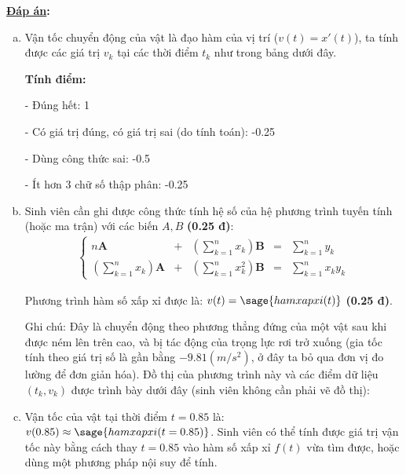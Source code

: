 \documentclass[12pt]{article}
\newcommand{\Solution}{
\medskip
{\bf \underline{Đáp án}:}
}
\begin{document}
\Solution

\begin{enumerate}[a).]
  \item Vận tốc chuyển động của vật là đạo hàm của vị trí ($v(t)=x'(t)$), ta tính được các giá trị $v_k$ tại các thời điểm $t_k$ như trong bảng dưới đây.

  \begin{center}  \end{center} 

  \textbf{Tính điểm:} 

- Đúng hết: 1

- Có giá trị đúng, có giá trị sai (do tính toán): -0.25

- Dùng công thức sai: -0.5

- Ít hơn 3 chữ số thập phân: -0.25

     \item Sinh viên cần ghi được công thức tính hệ số của hệ phương trình tuyến tính (hoặc ma trận) với các biến $A, B$ \textbf{(0.25 đ)}: %
     \begin{align*}
      \left\lbrace
	\begin{array}{rcccl}
	n \mathbf{A} &+& \left(\sum_{k=1}^n x_k \right) \mathbf{B} &=& \sum_{k=1}^n y_k \\
	\left(\sum_{k=1}^n x_k\right) \mathbf{A} &+& \left(\sum_{k=1}^n x_k^2 \right) \mathbf{B} &=& \sum_{k=1}^n x_k y_k
	\end{array}
      \right.
     \end{align*}

     Phương trình hàm số xấp xỉ được là: $v(t)=\sage{hamxapxi(t)}$ \textbf{(0.25 đ)}. 
     
     Ghi chú: Đây là chuyển động theo phương thẳng đứng của một vật sau khi được ném lên trên cao, và bị tác động của trọng lực rơi trở xuống (gia tốc tính theo giá trị số là gần bằng $-9.81 (m/s^2)$, ở đây ta bỏ qua đơn vị đo lường để đơn giản hóa). Đồ thị của phương trình này và các điểm dữ liệu $(t_k, v_k)$ được trình bày dưới đây (sinh viên không cần phải vẽ đồ thị):
     
     \begin{center}  \end{center} 
     
     \item Vận tốc của vật tại thời điểm $t=0.85$ là: $v(0.85) \approx \sage{hamxapxi(t=0.85)}$. Sinh viên có thể tính được giá trị vận tốc này bằng cách thay $t=0.85$ vào hàm số xấp xỉ $f(t)$ vừa tìm được, hoặc dùng một phương pháp nội suy để tính.
\end{enumerate}
\end{document}

